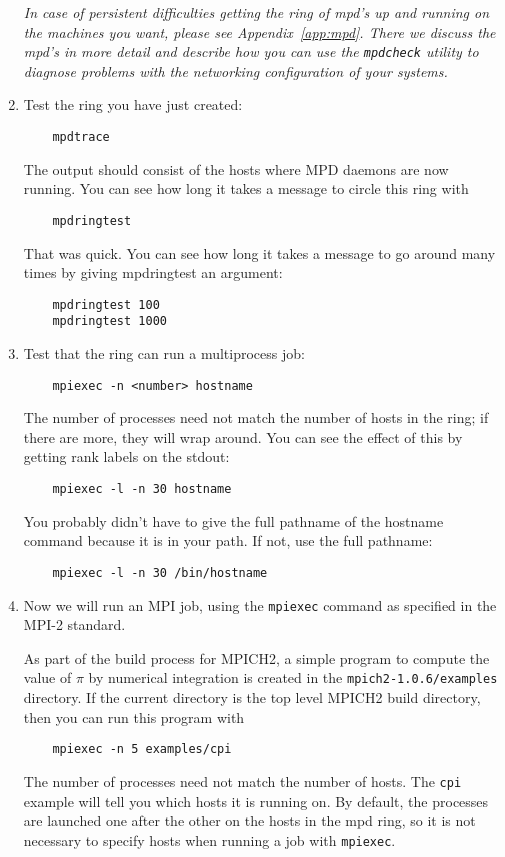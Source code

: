 \documentclass[dvipdfm,11pt]{article}
\begin{document}
\begin{enumerate}
{\em In case of persistent difficulties getting the ring of mpd's up
and running on the machines you want, please see
Appendix~\ref{app:mpd}.  There we discuss the mpd's in more detail and
describe how you can use the \texttt{mpdcheck} utility to diagnose
problems with the networking configuration of your systems.}


\item
Test the ring you have just created:
\begin{verbatim}
    mpdtrace
\end{verbatim}
The output should consist of the hosts where MPD daemons are now
running.  You can see how long it takes a message to circle this
ring with 
\begin{verbatim}
    mpdringtest
\end{verbatim}
That was quick.  You can see how long it takes a message to go
around many times by giving mpdringtest an argument:
\begin{verbatim}
    mpdringtest 100
    mpdringtest 1000
\end{verbatim}

\item
Test that the ring can run a multiprocess job:
\begin{verbatim}
    mpiexec -n <number> hostname
\end{verbatim}
The number of processes need not match the number of hosts in the
ring;  if there are more, they will wrap around.  You can see the
effect of this by getting rank labels on the stdout:
\begin{verbatim}
    mpiexec -l -n 30 hostname
\end{verbatim}
You probably didn't have to give the full pathname of the hostname
command because it is in your path.  If not, use the full pathname:
\begin{verbatim}
    mpiexec -l -n 30 /bin/hostname
\end{verbatim}

\item
Now we will run an MPI job, using the \texttt{mpiexec} command as specified
in the MPI-2 standard.  

As part of the build process for MPICH2, a simple program to compute the value
of $\pi$ by numerical integration is created in the
\texttt{mpich2-1.0.6/examples} directory.  If the current directory is the top
level MPICH2 build directory, then you can run this program with
\begin{verbatim}
    mpiexec -n 5 examples/cpi
\end{verbatim}
The number of processes need not match the number of hosts.
The \texttt{cpi} example will tell you which hosts it is running on.
By default, the processes are launched one after the other on the hosts
in the mpd ring, so it is not necessary to specify hosts when running a
job with \texttt{mpiexec}.


\end{enumerate}
\end{document}
